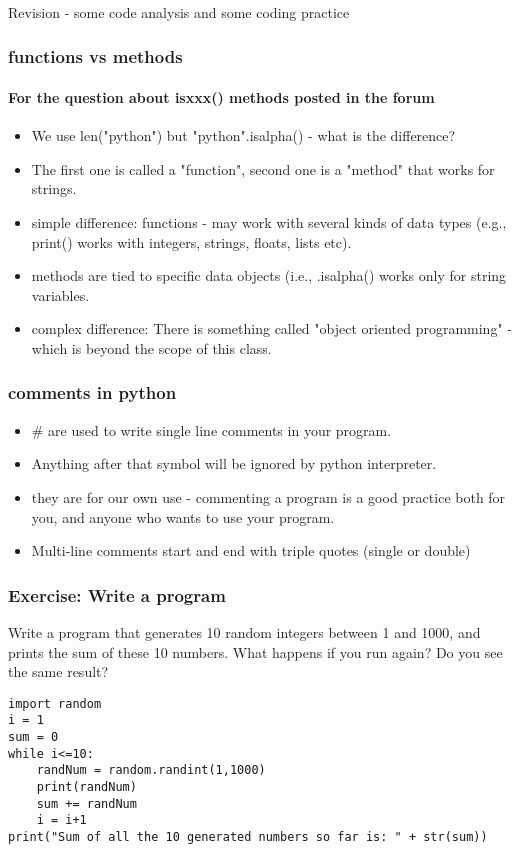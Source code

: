 \documentclass{beamer}
\begin{document}
\begin{frame}
\frametitle{}
\Large Revision - some code analysis and some coding practice
\end{frame}

\begin{frame}
\frametitle{functions vs methods}
\framesubtitle{For the question about isxxx() methods posted in the forum}
\begin{itemize}
\item We use len("python") but "python".isalpha() - what is the difference?
\item The first one is called a "function", second one is a "method" that works for strings. \pause
\item simple difference: functions - may work with several kinds of data types (e.g., print() works with integers, strings, floats, lists etc).
\item methods are tied to specific data objects (i.e., .isalpha() works only for string variables. 
\pause \item complex difference: There is something called "object oriented programming" - which is beyond the scope of this class.
\end{itemize}
\end{frame}

\begin{frame}
\frametitle{comments in python}
\begin{itemize}
\item \# are used to write single line comments in your program.
\item Anything after that symbol will be ignored by python interpreter.
\item they are for our own use - commenting a program is a good practice both for you, and anyone who wants to use your program.
\pause \item Multi-line comments start and end with triple quotes (single or double)
\end{itemize}
\end{frame}

\begin{frame}[fragile]
\frametitle{Exercise: Write a program}
Write a program that generates 10 random integers between 1 and 1000, and prints the sum of these 10 numbers. What happens if you run again? Do you see the same result? \pause
\scriptsize
\begin{verbatim}
import random
i = 1
sum = 0
while i<=10:
    randNum = random.randint(1,1000)
    print(randNum)
    sum += randNum
    i = i+1
print("Sum of all the 10 generated numbers so far is: " + str(sum))
\end{verbatim}
\end{frame}
\end{document}
